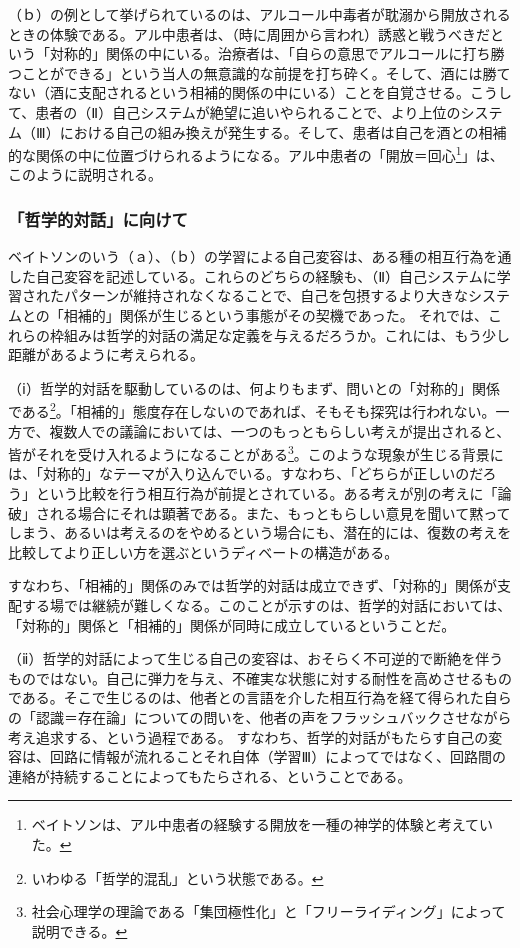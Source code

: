 \documentclass[b5j,twoside,twocolumn]{utarticle}
\begin{document}
（ｂ）の例として挙げられているのは、アルコール中毒者が耽溺から開放されるときの体験である。アル中患者は、（時に周囲から言われ）誘惑と戦うべきだという「対称的」関係の中にいる。治療者は、「自らの意思でアルコールに打ち勝つことができる」という当人の無意識的な前提を打ち砕く。そして、酒には勝てない（酒に支配されるという相補的関係の中にいる）ことを自覚させる。こうして、患者の（Ⅱ）自己システムが絶望に追いやられることで、より上位のシステム（Ⅲ）における自己の組み換えが発生する。そして、患者は自己を酒との相補的な関係の中に位置づけられるようになる。アル中患者の「開放＝回心\footnote{ベイトソンは、アル中患者の経験する開放を一種の神学的体験と考えていた。}」は、このように説明される。


\subsubsection*{「哲学的対話」に向けて}
ベイトソンのいう（ａ）、（ｂ）の学習による自己変容は、ある種の相互行為を通した自己変容を記述している。これらのどちらの経験も、（Ⅱ）自己システムに学習されたパターンが維持されなくなることで、自己を包摂するより大きなシステムとの「相補的」関係が生じるという事態がその契機であった。
それでは、これらの枠組みは哲学的対話の満足な定義を与えるだろうか。これには、もう少し距離があるように考えられる。


（ⅰ）哲学的対話を駆動しているのは、何よりもまず、問いとの「対称的」関係である\footnote{いわゆる「哲学的混乱」という状態である。}。「相補的」態度存在しないのであれば、そもそも探究は行われない。一方で、複数人での議論においては、一つのもっともらしい考えが提出されると、皆がそれを受け入れるようになることがある\footnote{社会心理学の理論である「集団極性化」と「フリーライディング」によって説明できる。}。このような現象が生じる背景には、「対称的」なテーマが入り込んでいる。すなわち、「どちらが正しいのだろう」という比較を行う相互行為が前提とされている。ある考えが別の考えに「論破」される場合にそれは顕著である。また、もっともらしい意見を聞いて黙ってしまう、あるいは考えるのをやめるという場合にも、潜在的には、復数の考えを比較してより正しい方を選ぶというディベートの構造がある。


すなわち、「相補的」関係のみでは哲学的対話は成立できず、「対称的」関係が支配する場では継続が難しくなる。このことが示すのは、哲学的対話においては、「対称的」関係と「相補的」関係が同時に成立しているということだ。


（ⅱ）哲学的対話によって生じる自己の変容は、おそらく不可逆的で断絶を伴うものではない。自己に弾力を与え、不確実な状態に対する耐性を高めさせるものである。そこで生じるのは、他者との言語を介した相互行為を経て得られた自らの「認識＝存在論」についての問いを、他者の声をフラッシュバックさせながら考え追求する、という過程である。%
すなわち、哲学的対話がもたらす自己の変容は、回路に情報が流れることそれ自体（学習Ⅲ）によってではなく、回路間の連絡が持続することによってもたらされる、ということである。
\end{document}
